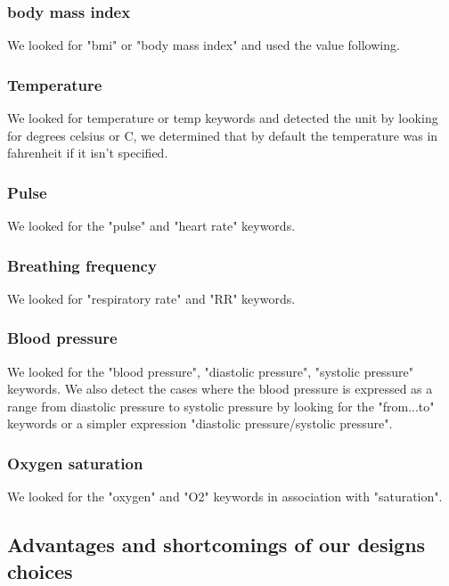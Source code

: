 \documentclass{eplDoc}
\begin{document}
\subsubsection{body mass index}

We looked for "bmi" or "body mass index" and used the value following. 

\subsubsection{Temperature}

We looked for temperature or temp keywords and detected the unit by looking for degrees celsius or C, we determined that by default the temperature was in fahrenheit if it isn't specified. 

\subsubsection{Pulse}

We looked for the "pulse" and "heart rate" keywords. 

\subsubsection{Breathing frequency}

We looked for "respiratory rate" and "RR" keywords. 

\subsubsection{Blood pressure}

We looked for the "blood pressure", "diastolic pressure", "systolic pressure" keywords. We also detect the cases where the blood pressure is expressed as a range from diastolic pressure to systolic pressure by looking for the "from...to" keywords or a simpler expression "diastolic pressure/systolic pressure". \\ 


\subsubsection{Oxygen saturation}

We looked for the "oxygen" and "O2" keywords in association with "saturation". 



\subsection{Advantages and shortcomings of our designs choices}
\end{document}

